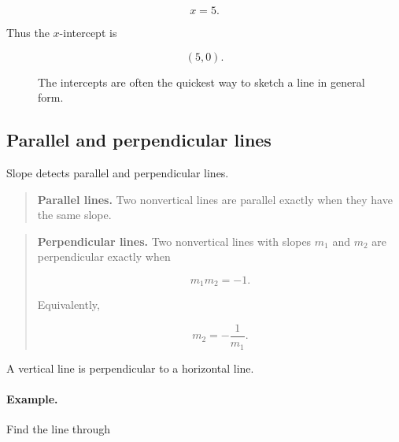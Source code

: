 \[
x=5.
\]

Thus the \(x\)-intercept is

\[
\boxed{(5,0)}.
\]

\begin{figure}[h]
\centering
{}
\caption{The intercepts are often the quickest way to sketch a line in general form.}
\label{fig:appendix-line-intercepts}
\end{figure}

\subsection{Parallel and perpendicular lines}
\label{appsubsec:parallel-perpendicular-lines}

Slope detects parallel and perpendicular lines.

\begin{quote}
\textbf{Parallel lines.}
Two nonvertical lines are parallel exactly when they have the same slope.
\end{quote}

\begin{quote}
\textbf{Perpendicular lines.}
Two nonvertical lines with slopes \(m_1\) and \(m_2\) are perpendicular exactly when

\[
\boxed{
m_1m_2=-1.
}
\]

Equivalently,

\[
m_2=-\frac1{m_1}.
\]
\end{quote}

A vertical line is perpendicular to a horizontal line.

\paragraph{Example.}
Find the line through

